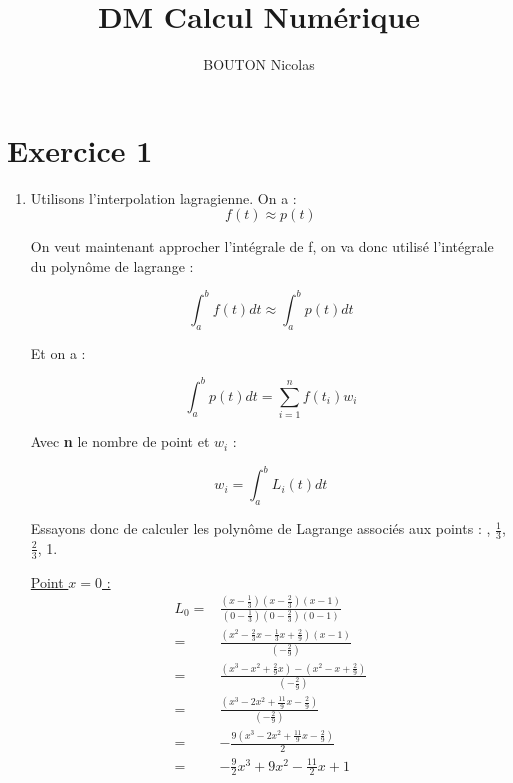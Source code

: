 \documentclass{article}
\title{DM Calcul Numérique}
\author{BOUTON Nicolas}
\begin{document}
\maketitle

\section*{Exercice 1}

\begin{enumerate}

\item 

  Utilisons l'interpolation lagragienne.\newline
  On a :
  $$ f(t) \approx p(t) $$

  On veut maintenant approcher l'intégrale de f, on va donc utilisé
  l'intégrale du polynôme de lagrange :

  \begin{equation*}
    \int_a^b {f(t) dt} \approx \int_a^b {p(t) dt}
  \end{equation*}

  Et on a :

  \begin{equation*}
    \int_a^b {p(t) dt} = \sum_{i = 1}^{n} {f(t_i)w_i}
  \end{equation*}

  Avec \textbf{n} le nombre de point et $w_i$ :

  \begin{equation*}
    w_i = \int_a^b {L_i(t)dt}
  \end{equation*}

Essayons donc de calculer les polynôme de Lagrange associés aux points
: , $\frac{1}{3}$, $\frac{2}{3}$, 1.

\underline{Point $x = 0$ :}
\begin{equation*}
  \begin{split}
    L_0 = & \frac{(x - \frac{1}{3}) (x - \frac{2}{3}) (x - 1)}
    {(0 - \frac{1}{3}) (0 - \frac{2}{3}) (0 - 1)} \\
    = & \frac{(x^2 - \frac{2}{3}x - \frac{1}{3}x + \frac{2}{9}) (x - 1)}
    {(- \frac{2}{9})} \\
    = & \frac{(x^3 - x^2 + \frac{2}{9}x) - (x^2 - x + \frac{2}{9}) }
    {(- \frac{2}{9})} \\
    = & \frac{(x^3 - 2x^2 + \frac{11}{9}x - \frac{2}{9}) }
    {(- \frac{2}{9})} \\
    = & - \frac{ 9 (x^3 - 2x^2 + \frac{11}{9}x - \frac{2}{9}) }
    {2} \\
    = & - \frac{9}{2}x^3 + 9 x^2 - \frac{11}{2}x + 1
  \end{split}
\end{equation*}


\end{enumerate}
\end{document}
